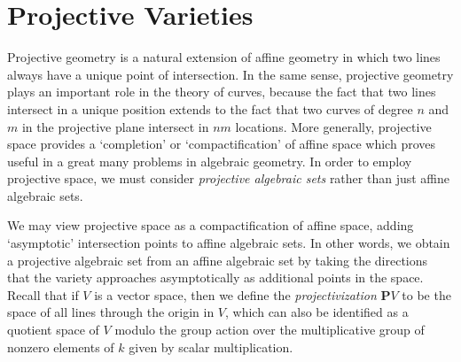 
\section{Projective Varieties}

Projective geometry is a natural extension of affine geometry in which two lines always have a unique point of intersection. In the same sense, projective geometry plays an important role in the theory of curves, because the fact that two lines intersect in a unique position extends to the fact that two curves of degree $n$ and $m$ in the projective plane intersect in $nm$ locations. More generally, projective space provides a `completion' or `compactification' of affine space which proves useful in a great many problems in algebraic geometry. In order to employ projective space, we must consider \emph{projective algebraic sets} rather than just affine algebraic sets.

We may view projective space as a compactification of affine space, adding `asymptotic' intersection points to affine algebraic sets. In other words, we obtain a projective algebraic set from an affine algebraic set by taking the directions that the variety approaches asymptotically as additional points in the space. Recall that if $V$ is a vector space, then we define the {\it projectivization} $\mathbf{P} V$ to be the space of all lines through the origin in $V$, which can also be identified as a quotient space of $V$ modulo the group action over the multiplicative group of nonzero elements of $k$ given by scalar multiplication.

